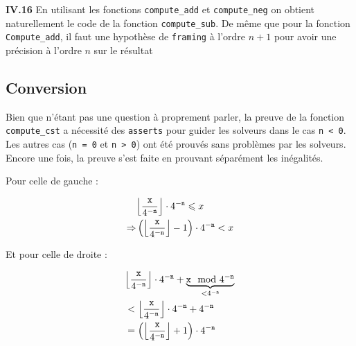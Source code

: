 \documentclass[9pt,a4paper,twocolumn]{article}
\theoremstyle{definition}
\DeclarePairedDelimiter\floor{\lfloor}{\rfloor}
\renewcommand{\leq}{\leqslant}
\newenvironment{code}[1][ocaml]{%
\newgeometry{textwidth = 0.8\textwidth}
\VerbatimEnvironment\begin{verbatim}%
}{%
\end{verbatim}
\restoregeometry
}
\begin{document}
\textbf{IV.16}
En utilisant les fonctions \texttt{compute\_add} et \texttt{compute\_neg}
on obtient naturellement le code de la fonction \texttt{compute\_sub}.
De même que pour la fonction \texttt{Compute\_add}, il faut une hypothèse de
\texttt{framing} à l'ordre $n+1$ pour avoir une précision à l'ordre $n$ sur le
résultat


\subsection{Conversion}

Bien que n'étant pas une question à proprement parler, la preuve de la fonction
\texttt{compute\_cst} a nécessité des \texttt{asserts} pour guider les solveurs
dans le cas \texttt{n < 0}. Les autres cas (\texttt{n = 0} et \texttt{n > 0})
ont été prouvés sans problèmes par les solveurs.
Encore une fois, la preuve s'est faite en prouvant séparément les inégalités.

Pour celle de gauche :

\begin{align*}
   &\floor*{\frac{\texttt{x}}{4^{-\texttt{n}}}}\cdot 4^{-\texttt{n}}
      \leq x\\
\Rightarrow
   &\left(\floor*{\frac{\texttt{x}}{4^{-\texttt{n}}}}-1\right)\cdot 4^{-\texttt{n}}
      < x\\
\end{align*}

Et pour celle de droite :

\begin{align*}
   &\floor*{\frac{\texttt{x}}{4^{-\texttt{n}}}}\cdot 4^{-\texttt{n}}
      + \underbrace{\texttt{x} \mod 4^{-\texttt{n}}}_{<4^{-\texttt{n}}} \\
   &< \floor*{\frac{\texttt{x}}{4^{-\texttt{n}}}}\cdot 4^{-\texttt{n}}
      + 4^{-\texttt{n}} \\
   & = \left(\floor*{\frac{\texttt{x}}{4^{-\texttt{n}}}}+1\right)\cdot 4^{-\texttt{n}}
\end{align*}
\end{document}
